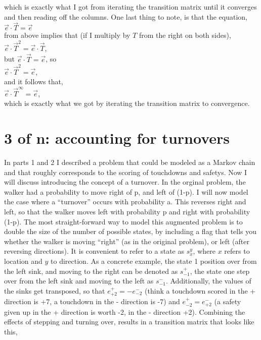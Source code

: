 \documentclass{article}
\begin{document}
which is exactly what I got from iterating the transition matrix until it converges and then reading off the columns. One last thing to note, is that the equation, \\

$
\vec{e} \cdot \vec{T} = \vec{e}$ \\

from above implies that (if I multiply by $T$ from the right on both sides), \\

$\vec{e} \cdot \vec{T}^2 = \vec{e} \cdot \vec{T}$,  \\

but $\vec{e} \cdot \vec{T} = \vec{e}$, so \\

$\vec{e} \cdot \vec{T}^{2} = \vec{e}$,  \\

and it follows that, \\

$\vec{e} \cdot \vec{T}^{\infty} = \vec{e}$,  \\

which is exactly what we got by iterating the transition matrix to convergence.


\section{3 of n: accounting for turnovers}

In parts 1 and 2 I described a problem that could be modeled as a Markov chain and that roughly corresponds to the scoring of touchdowns and safetys. Now I will discuss introducing the concept of a turnover. In the orginal problem, the walker had a probability to move right of p, and left of (1-p). I will now model the case where a ``turnover'' occurs with probability a. This reverses right and left, so that the walker moves left with probability p and right with probability (1-p). The most straight-forward way to model this augmented problem is to double the size of the number of possible states, by including a flag that tells you whether the walker is moving ``right'' (as in the original problem), or left (after reversing directions). It is convenient to refer to a state as $s^{y}_{x}$, where $x$ refers to location and $y$ to direction. As a concrete example, the state 1 position over from the left sink, and moving to the right can be denoted as $s^{+}_{-1}$, the state one step over from the left sink and moving to the left as $s^{-}_{-1}$. Additionally, the values of the sinks get transposed, so that $e^{+}_{+2} = -e^{-}_{-2}$ (think a touchdown scored in the + direction is +7, a touchdown in the - direction is -7) and $e^{+}_{-2} = e^{-}_{+2}$ (a safety given up in the + direction is worth -2, in the - direction +2). Combining the effects of stepping and turning over, results in a transition matrix that looks like this, \\
\end{document}
